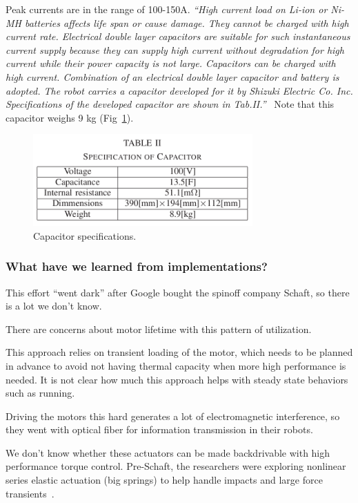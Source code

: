 \documentclass[letterpaper,12pt,fullpage]{article}
\begin{document}
Peak currents are in the range of 100-150A.
{\it
``High current load on Li-ion or Ni-MH batteries affects life
span or cause damage. They cannot be charged with high
current rate. Electrical double layer capacitors are suitable for
such instantaneous current supply because they can supply
high current without degradation for high current while
their power capacity is not large. Capacitors can be charged
with high current. Combination of an electrical double layer
capacitor and battery is adopted. The robot carries a capacitor
developed for it by Shizuki Electric Co. Inc. Specifications of
the developed capacitor are shown in Tab.II.''}~\cite{IEEE05649683}
Note that this capacitor weighs 9 kg (Fig~\ref{f:s2}).

\begin{figure}[h]
\centering
\includegraphics[width=0.75\textwidth]{tech-figs/s2}
\caption{Capacitor specifications.}
\label{f:s2}
\end{figure}

\subsubsection{What have we learned from implementations?}

This effort ``went dark'' after Google bought the spinoff company
Schaft, so there is a lot we don't know.

There are concerns about motor lifetime with this pattern of utilization.

This approach relies on transient loading of the motor, which needs
to be planned in advance to avoid not having thermal capacity
when more high performance is needed.
It is not clear how much this approach helps with 
steady state behaviors such as running.

Driving the motors this hard generates a lot of electromagnetic interference,
so they went with optical fiber for information transmission in their
robots.

We don't know whether these actuators can be made backdrivable with
high performance torque control. Pre-Schaft, the researchers were exploring
nonlinear series elastic actuation (big springs)
to help handle impacts and large force
transients~\cite{IEEE06651562}.
\end{document}
